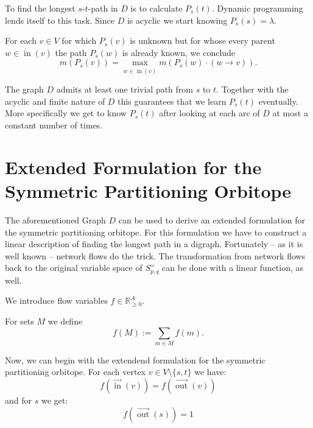 \documentclass[a4paper]{amsart}
\theoremstyle{definition}
\theoremstyle{remark}
\DeclareMathOperator{\In}{in}
\DeclareMathOperator{\Out}{out}
\newcommand{\ina}{\ensuremath{\vec{\In}}}
\newcommand{\outa}{\ensuremath{\vec{\Out}}}
\newcommand{\inv}{\ensuremath{\dot{\In}}}
\begin{document}
To find the longest \(s\)-\(t\)-path in \(D\) is to calculate
\(P_s (t)\).  Dynamic programming lends itself to this task.  Since
\(D\) is acyclic we start knowing \(P_s (s) = \lambda\).

For each \(v \in V\) for which \(P_s (v)\) is unknown but for whose
every parent \(w \in \inv(v)\) the path \(P_s (w)\) is already known,
we conclude
\[m\left(P_s \left(v\right)\right) = \max_{w \in \inv(v)}
m\left(P_s(w) \cdot \left(w \rightarrow v \right) \right)\text{.}\]

The graph \(D\) admits at least one trivial path from \(s\) to \(t\).
Together with the acyclic and finite nature of \(D\) this guarantees that we
learn \(P_s (t)\) eventually.  More specifically we get to know \(P_s
(t)\) after looking at each arc of \(D\) at most a constant number of
times.





\section{Extended Formulation for the Symmetric Partitioning Orbitope}
The aforementioned Graph \(D\) can be used to derive an extended
formulation for the  symmetric partitioning orbitope.  For this
formulation we have to construct a linear description of finding the
longest path in a digraph.  Fortunately -- as it is well known --
network flows do the trick.  The transformation from network flows
back to the original variable space of \(S^=_{p, q}\) can be done with
a linear function, as well.

We introduce flow variables \(f \in \mathbb{R}^A_{\geq 0}\).  

For sets \(M\) we define
\[f (M) := \sum_{m\in M} f(m)\text{.}\]

Now, we can begin with the extendend formulation for the 
symmetric partitioning orbitope.  For each vertex \(v \in V \setminus
\{s, t\}\) we have:
\begin{equation}
f\left(\ina(v)\right) = f\left(\outa(v)\right)
\end{equation}
and for \(s\) we get:
\begin{equation}
f\left(\outa(s)\right) = 1
\end{equation}
\end{document}
